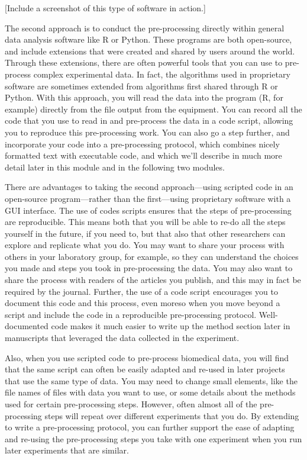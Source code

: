 \documentclass[]{tufte-book}
\begin{document}
{[}Include a screenshot of this type of software in action.{]}

The second approach is to conduct the pre-processing directly within general
data analysis software like R or Python. These programs are both open-source,
and include extensions that were created and shared by users around the world.
Through these extensions, there are often powerful tools that you can use to
pre-process complex experimental data. In fact, the algorithms used in
proprietary software are sometimes extended from algorithms first shared through
R or Python. With this approach, you will read the data into the program (R,
for example) directly from the file output from the equipment. You can
record all the code that you use to read in and pre-process the data in a
code script, allowing you to reproduce this pre-processing work. You can
also go a step further, and incorporate your code into a pre-processing
protocol, which combines nicely formatted text with executable code, and
which we'll describe in much more detail later in this module and in the
following two modules.

There are advantages to taking the second approach---using scripted code in an
open-source program---rather than the first---using proprietary software with a
GUI interface. The use of codes scripts ensures that the steps of pre-processing
are reproducible. This means both that you will be able to re-do all the steps
yourself in the future, if you need to, but that also that other researchers can
explore and replicate what you do. You may want to share your process with
others in your laboratory group, for example, so they can understand the choices
you made and steps you took in pre-processing the data. You may also want to
share the process with readers of the articles you publish, and this may in fact
be required by the journal. Further, the use of a code script encourages you to
document this code and this process, even moreso when you move beyond a script
and include the code in a reproducible pre-processing protocol. Well-documented
code makes it much easier to write up the method section later in manuscripts
that leveraged the data collected in the experiment.

Also, when you use scripted code to pre-process biomedical data, you will find
that the same script can often be easily adapted and re-used in later projects
that use the same type of data. You may need to change small elements, like the
file names of files with data you want to use, or some details about the methods
used for certain pre-processing steps. However, often almost all of the
pre-processing steps will repeat over different experiments that you do. By
extending to write a pre-processing protocol, you can further support the
ease of adapting and re-using the pre-processing steps you take with one
experiment when you run later experiments that are similar.
\end{document}
